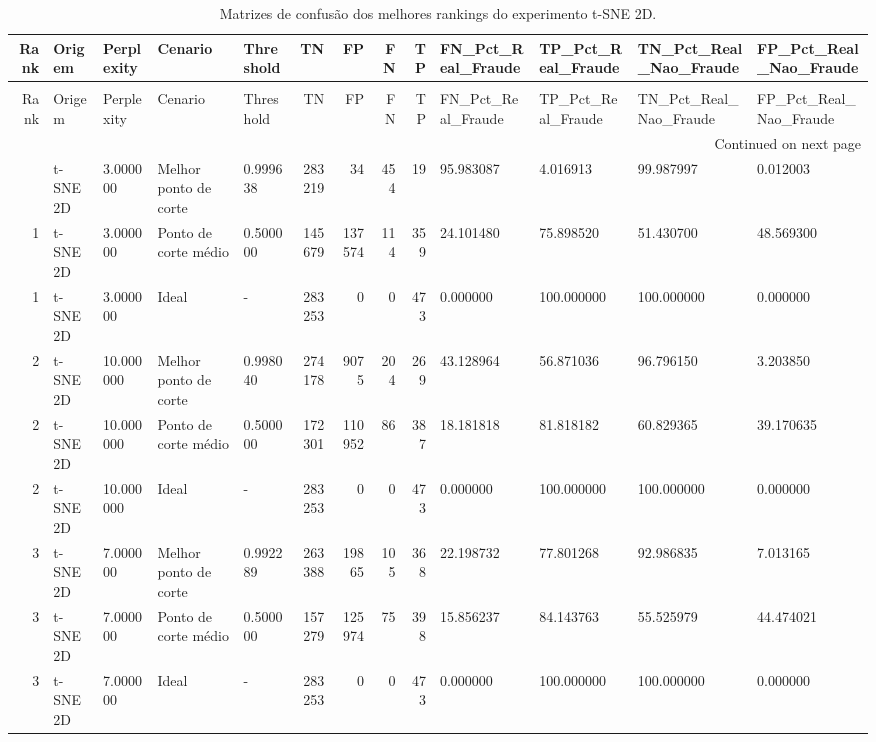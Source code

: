 \begin{longtable}{rllllrrrrllll}
\caption{Matrizes de confusão dos melhores rankings do experimento t-SNE 2D.} \label{tab:matrizes-confusao-ranks-2x2} \\
\toprule
Rank & Origem & Perplexity & Cenario & Threshold & TN & FP & FN & TP & FN\_Pct\_Real\_Fraude & TP\_Pct\_Real\_Fraude & TN\_Pct\_Real\_Nao\_Fraude & FP\_Pct\_Real\_Nao\_Fraude \\
\midrule
\endfirsthead
\caption[]{Matrizes de confusão dos melhores rankings do experimento t-SNE 2D.} \\
\toprule
Rank & Origem & Perplexity & Cenario & Threshold & TN & FP & FN & TP & FN\_Pct\_Real\_Fraude & TP\_Pct\_Real\_Fraude & TN\_Pct\_Real\_Nao\_Fraude & FP\_Pct\_Real\_Nao\_Fraude \\
\midrule
\endhead
\midrule
\multicolumn{13}{r}{Continued on next page} \\
\midrule
\endfoot
\bottomrule
\endlastfoot
1 & t-SNE 2D & 3.000000 & Melhor ponto de corte & 0.999638 & 283219 & 34 & 454 & 19 & 95.983087 & 4.016913 & 99.987997 & 0.012003 \\
1 & t-SNE 2D & 3.000000 & Ponto de corte médio & 0.500000 & 145679 & 137574 & 114 & 359 & 24.101480 & 75.898520 & 51.430700 & 48.569300 \\
1 & t-SNE 2D & 3.000000 & Ideal & - & 283253 & 0 & 0 & 473 & 0.000000 & 100.000000 & 100.000000 & 0.000000 \\
2 & t-SNE 2D & 10.000000 & Melhor ponto de corte & 0.998040 & 274178 & 9075 & 204 & 269 & 43.128964 & 56.871036 & 96.796150 & 3.203850 \\
2 & t-SNE 2D & 10.000000 & Ponto de corte médio & 0.500000 & 172301 & 110952 & 86 & 387 & 18.181818 & 81.818182 & 60.829365 & 39.170635 \\
2 & t-SNE 2D & 10.000000 & Ideal & - & 283253 & 0 & 0 & 473 & 0.000000 & 100.000000 & 100.000000 & 0.000000 \\
3 & t-SNE 2D & 7.000000 & Melhor ponto de corte & 0.992289 & 263388 & 19865 & 105 & 368 & 22.198732 & 77.801268 & 92.986835 & 7.013165 \\
3 & t-SNE 2D & 7.000000 & Ponto de corte médio & 0.500000 & 157279 & 125974 & 75 & 398 & 15.856237 & 84.143763 & 55.525979 & 44.474021 \\
3 & t-SNE 2D & 7.000000 & Ideal & - & 283253 & 0 & 0 & 473 & 0.000000 & 100.000000 & 100.000000 & 0.000000 \\
\end{longtable}
